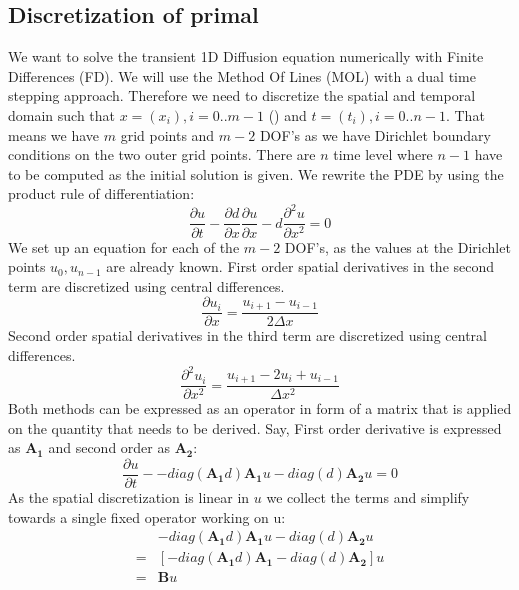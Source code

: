 \subsection{Discretization of primal}
We want to solve the transient 1D Diffusion equation numerically with Finite Differences (FD). We will use the Method Of Lines (MOL) with a dual time stepping approach. Therefore we need to discretize the spatial and temporal domain such that $x=(x_i), i=0..m-1$ () and $t=(t_i), i=0 .. n-1$. That means we have $m$ grid points and $m-2$ DOF's as we have Dirichlet boundary conditions on the two outer grid points. There are $n$ time level where $n-1$ have to be computed as the initial solution is given. We rewrite the PDE by using the product rule of differentiation:
\begin{equation}
\frac{\partial u}{\partial t} - \frac{\partial d}{\partial x}\frac{\partial u}{\partial x} -d \frac{\partial^2 u}{\partial x^2}  = 0
\end{equation}
We set up an equation for each of the $m-2$ DOF's, as the values at the Dirichlet points $u_0, u_{n-1}$ are already known. First order spatial derivatives in the second term are discretized using central differences.
\begin{equation}
\frac{\partial u_i}{\partial x} = \frac{u_{i+1} - u_{i-1}}{2\Delta x}
\end{equation}
Second order spatial derivatives in the third term are discretized using central differences.
\begin{equation}
\frac{\partial^2 u_i}{\partial x^2} = \frac{u_{i+1} - 2 u_{i} + u_{i-1}}{\Delta x^2}
\end{equation}
Both methods can be expressed as an operator in form of a matrix that is applied on the quantity that needs to be derived. Say, First order derivative is expressed as $\mathbf{A_1}$ and second order as $\mathbf{A_2}$:
\begin{equation}
\frac{\partial u}{\partial t} - -diag(\mathbf{A_1}d)\mathbf{A_1}u - diag(d) \mathbf{A_2}u = 0
\end{equation}
As the spatial discretization is linear in $u$ we collect the terms and simplify towards a single fixed operator working on u:
\begin{align}
&-diag(\mathbf{A_1}d)\mathbf{A_1}u - diag(d) \mathbf{A_2}u \\
=&\left[ -diag(\mathbf{A_1}d)\mathbf{A_1} - diag(d) \mathbf{A_2} \right]u \\
=& \mathbf{B}u
\end{align}
